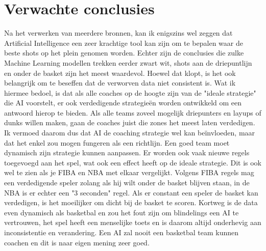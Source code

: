 \documentclass{hogent-article}
\begin{document}
\section{Verwachte conclusies}
Na het verwerken van meerdere bronnen, kan ik enigszins wel zeggen dat Artificial Intelligence een zeer krachtige tool kan zijn om te bepalen waar de beste shots op het plein genomen worden. Echter zijn de conclusies die zulke Machine Learning modellen trekken eerder zwart wit, shots aan de driepuntlijn en onder de basket zijn het meest waardevol. Hoewel dat klopt, is het ook belangrijk om te beseffen dat de verworven data niet consistent is. Wat ik hiermee bedoel, is dat als alle coaches op de hoogte zijn van de "ideale strategie" die AI voorstelt, er ook verdedigende strategieën worden ontwikkeld om een antwoord hierop te bieden. Als alle teams zoveel mogelijk driepunters en layups of dunks willen maken, gaan de coaches juist die zones het meest laten verdedigen.
Ik vermoed daarom dus dat AI de coaching strategie wel kan beïnvloeden, maar dat het enkel zou mogen fungeren als een richtlijn. Een goed team moet dynamisch zijn strategie kunnen aanpassen. Er worden ook vaak nieuwe regels toegevoegd aan het spel, wat ook een effect heeft op de ideale strategie. Dit is ook wel te zien als je FIBA en NBA met elkaar vergelijkt. Volgens FIBA regels mag een verdedigende speler zolang als hij wilt onder de basket blijven staan, in de NBA is er echter een "3 seconden" regel. Als er constant een speler de basket kan verdedigen, is het moeilijker om dicht bij de basket te scoren.
Kortweg is de data even dynamisch als basketbal en zou het fout zijn om blindelings een AI te vertrouwen, het spel heeft een menselijke toets en is daarom altijd onderhevig aan inconsistentie en verandering. Een AI zal nooit een basketbal team kunnen coachen en dit is naar eigen mening zeer goed.

\printglossary[type=\acronymtype]
\printglossary
\clearpage
\printbibliography[heading=bibintoc]
\end{document}
